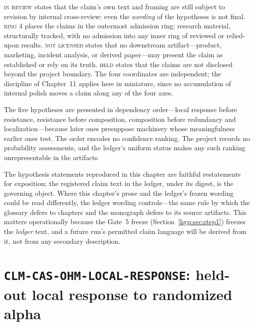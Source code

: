 \textsc{in review} states that the claim's own text and framing are still subject to revision by internal cross-review; even the \emph{wording} of the hypotheses is not final. \textsc{ring 4} places the claims in the outermost admission ring: research material, structurally tracked, with no admission into any inner ring of reviewed or relied-upon results. \textsc{not licensed} states that no downstream artifact---product, marketing, incident analysis, or derived paper---may present the claim as established or rely on its truth. \textsc{held} states that the claims are not disclosed beyond the project boundary. The four coordinates are independent; the discipline of Chapter~11 applies here in miniature, since no accumulation of internal polish moves a claim along any of the four axes.

\begin{remark}\label{hyp:rem:noorder}
The five hypotheses are presented in dependency order---local response before resistance, resistance before composition, composition before redundancy and localization---because later ones presuppose machinery whose meaningfulness earlier ones test. The order encodes no confidence ranking. The project records no probability assessments, and the ledger's uniform status makes any such ranking unrepresentable in the artifacts.
\end{remark}

\begin{remark}\label{hyp:rem:ledgertext}
The hypothesis statements reproduced in this chapter are faithful restatements for exposition; the registered claim text in the ledger, under its digest, is the governing object. Where this chapter's prose and the ledger's frozen wording could be read differently, the ledger wording controls---the same rule by which the glossary defers to chapters and the monograph defers to its source artifacts. This matters operationally because the Gate~5 freeze (Section~\ref{hyp:sec:step1}) freezes the \emph{ledger} text, and a future run's permitted claim language will be derived from it, not from any secondary description.
\end{remark}

\section{\texttt{CLM-CAS-OHM-LOCAL-RESPONSE}: held-out local response to randomized alpha}\label{hyp:sec:localresponse}

